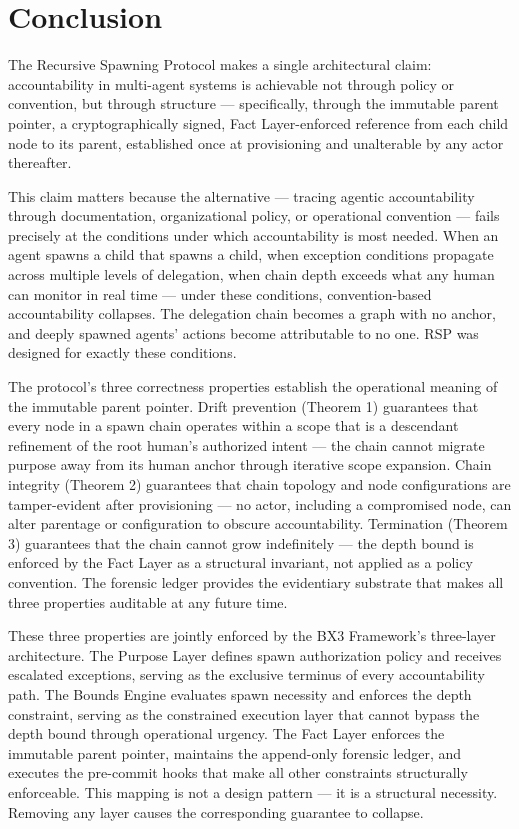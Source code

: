 \section{Conclusion}
\label{sec:rs-conclusion}

The Recursive Spawning Protocol makes a single architectural claim: accountability in multi-agent systems is achievable not through policy or convention, but through structure — specifically, through the immutable parent pointer, a cryptographically signed, Fact Layer-enforced reference from each child node to its parent, established once at provisioning and unalterable by any actor thereafter.

This claim matters because the alternative — tracing agentic accountability through documentation, organizational policy, or operational convention — fails precisely at the conditions under which accountability is most needed. When an agent spawns a child that spawns a child, when exception conditions propagate across multiple levels of delegation, when chain depth exceeds what any human can monitor in real time — under these conditions, convention-based accountability collapses. The delegation chain becomes a graph with no anchor, and deeply spawned agents' actions become attributable to no one. RSP was designed for exactly these conditions.

The protocol's three correctness properties establish the operational meaning of the immutable parent pointer. Drift prevention (Theorem 1) guarantees that every node in a spawn chain operates within a scope that is a descendant refinement of the root human's authorized intent — the chain cannot migrate purpose away from its human anchor through iterative scope expansion. Chain integrity (Theorem 2) guarantees that chain topology and node configurations are tamper-evident after provisioning — no actor, including a compromised node, can alter parentage or configuration to obscure accountability. Termination (Theorem 3) guarantees that the chain cannot grow indefinitely — the depth bound is enforced by the Fact Layer as a structural invariant, not applied as a policy convention. The forensic ledger provides the evidentiary substrate that makes all three properties auditable at any future time.

These three properties are jointly enforced by the BX3 Framework's three-layer architecture. The Purpose Layer defines spawn authorization policy and receives escalated exceptions, serving as the exclusive terminus of every accountability path. The Bounds Engine evaluates spawn necessity and enforces the depth constraint, serving as the constrained execution layer that cannot bypass the depth bound through operational urgency. The Fact Layer enforces the immutable parent pointer, maintains the append-only forensic ledger, and executes the pre-commit hooks that make all other constraints structurally enforceable. This mapping is not a design pattern — it is a structural necessity. Removing any layer causes the corresponding guarantee to collapse.

